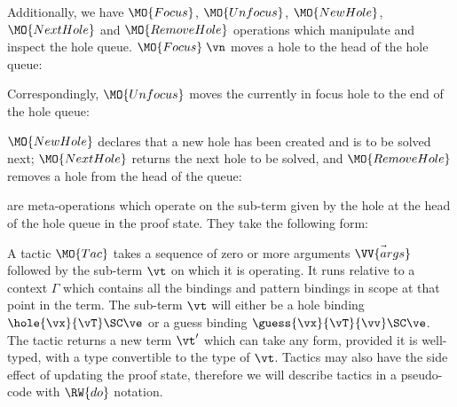 \noindent
Additionally, we have $\MO{Focus}$, $\MO{Unfocus}$, $\MO{NewHole}$,
$\MO{NextHole}$ and $\MO{RemoveHole}$
operations which manipulate and inspect
the hole queue. $\MO{Focus}\;\vn$ moves a hole to the head of the hole queue:


\noindent
Correspondingly, $\MO{Unfocus}$ moves the currently in focus hole to the
end of the hole queue:


\noindent
$\MO{NewHole}$ declares that a new hole has been created and is to be solved
next; $\MO{NextHole}$ returns the next hole to be solved, and $\MO{RemoveHole}$
removes a hole from the head of the queue:


\noindent
{} are meta-operations which operate on the sub-term given by the
hole at the head of the hole queue in the proof state. They take the following
form:


A tactic $\MO{Tac}$ takes a sequence of zero or more arguments
$\vec{\VV{args}}$ followed by the sub-term $\vt$ on which it is operating. It
runs relative to a context $\Gamma$ which contains all the bindings and pattern
bindings in scope at that point in the term. The sub-term $\vt$ will either be
a hole binding $\hole{\vx}{\vT}\SC\ve$ or a guess binding
$\guess{\vx}{\vT}{\vv}\SC\ve$. The tactic returns a new term $\vt'$ which can
take any form, provided it is well-typed, with a type convertible to the type
of $\vt$.  Tactics may also have the side effect of updating the proof state,
therefore we will describe tactics in a pseudo-code with $\RW{do}$ notation.

